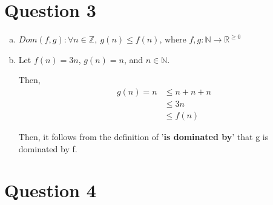 \documentclass[12pt]{article}
\begin{document}
\section*{Question 3}
\begin{enumerate}[a.]
    \item

    $Dom(f,g): \forall n \in \mathbb{Z},\: g(n) \leq f(n)$, where $f,g: \mathbb{N}
    \to \mathbb{R}^{\geq 0}$

    \item

    Let $f(n) = 3n$, $g(n) = n$, and $n \in \mathbb{N}$.

    \bigskip

    Then,
    \setcounter{equation}{0}
    \begin{align}
        g(n) = n &\leq n + n + n\\
        &\leq 3n\\
        &\leq f(n)
    \end{align}

    Then, it follows from the definition of '\textbf{is dominated by}' that g is
    dominated by f.
\end{enumerate}

\section*{Question 4}
\end{document}
